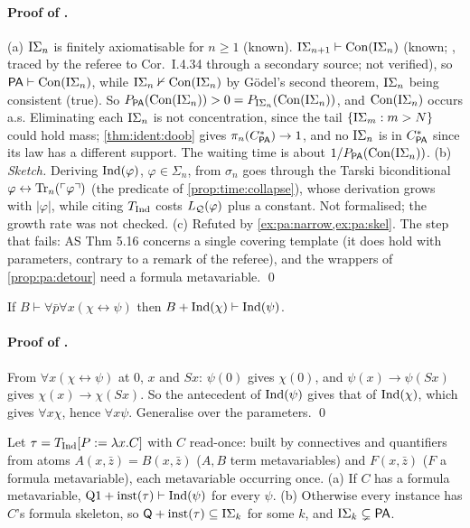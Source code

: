 \paragraph{Proof of .} (a) $\mathrm{I}\Sigma_{n}$ is finitely axiomatisable for $n\ge1$ (known). $\mathrm{I}\Sigma_{n+1}\vdash\mathrm{Con}(\mathrm{I}\Sigma_{n})$ (known; \citealp{hajek1993metamathematics}, traced by the referee to Cor.~I.4.34 through a secondary source; not verified), so $\mathsf{PA}\vdash\mathrm{Con}(\mathrm{I}\Sigma_{n})$, while $\mathrm{I}\Sigma_{n}\nvdash\mathrm{Con}(\mathrm{I}\Sigma_{n})$ by G\"odel's second theorem, $\mathrm{I}\Sigma_{n}$ being consistent (true). So $P_{\mathsf{PA}}(\mathrm{Con}(\mathrm{I}\Sigma_{n}))>0=P_{\mathrm{I}\Sigma_{n}}(\mathrm{Con}(\mathrm{I}\Sigma_{n}))$, and $\mathrm{Con}(\mathrm{I}\Sigma_{n})$ occurs a.s. Eliminating each $\mathrm{I}\Sigma_{n}$ is not concentration, since the tail $\{\mathrm{I}\Sigma_{m}:m>N\}$ could hold mass; \cref{thm:ident:doob} gives $\pi_n(C^{*}_{\mathsf{PA}})\to1$, and no $\mathrm{I}\Sigma_{n}$ is in $C^{*}_{\mathsf{PA}}$ since its law has a different support. The waiting time is about $1/P_{\mathsf{PA}}(\mathrm{Con}(\mathrm{I}\Sigma_{n}))$. (b) \emph{Sketch.} Deriving $\mathrm{Ind}(\varphi)$, $\varphi\in\Sigma_n$, from $\sigma_n$ goes through the Tarski biconditional $\varphi\leftrightarrow\mathrm{Tr}_n(\ulcorner \varphi\urcorner)$ (the predicate of \cref{prop:time:collapse}), whose derivation grows with $|\varphi|$, while citing $T_{\mathrm{Ind}}$ costs $L_{\mathcal{Q}}(\varphi)$ plus a constant. Not formalised; the growth rate was not checked. (c) Refuted by \cref{ex:pa:narrow,ex:pa:skel}. The step that fails: AS Thm 5.16 concerns a single covering template (it does hold with parameters, contrary to a remark of the referee), and the wrappers of \cref{prop:pa:detour} need a formula metavariable. \qed

\begin{lemma}\pabrk{}\label{lem:pa:motive}
If $B\vdash\forall\bar p\forall x(\chi\leftrightarrow\psi)$ then $B+\mathrm{Ind}(\chi)\vdash\mathrm{Ind}(\psi)$.
\end{lemma}

\paragraph{Proof of .} From $\forall x(\chi\leftrightarrow\psi)$ at $0$, $x$ and $Sx$: $\psi(0)$ gives $\chi(0)$, and $\psi(x)\to\psi(Sx)$ gives $\chi(x)\to\chi(Sx)$. So the antecedent of $\mathrm{Ind}(\psi)$ gives that of $\mathrm{Ind}(\chi)$, which gives $\forall x\chi$, hence $\forall x\psi$. Generalise over the parameters. \qed

\begin{proposition}\pabrk{}\label{prop:pa:readonce}
Let $\tau=T_{\mathrm{Ind}}[P:=\lambda x.C]$ with $C$ read-once: built by connectives and quantifiers from atoms $A(x,\bar z)=B(x,\bar z)$ ($A,B$ term metavariables) and $F(x,\bar z)$ ($F$ a formula metavariable), each metavariable occurring once. (a) If $C$ has a formula metavariable, $\mathrm{Q1}+\mathrm{inst}(\tau)\vdash\mathrm{Ind}(\psi)$ for every $\psi$. (b) Otherwise every instance has $C$'s formula skeleton, so $\mathsf{Q}+\mathrm{inst}(\tau)\subseteq\mathrm{I}\Sigma_{k}$ for some $k$, and $\mathrm{I}\Sigma_{k}\subsetneq\mathsf{PA}$.
\end{proposition}

